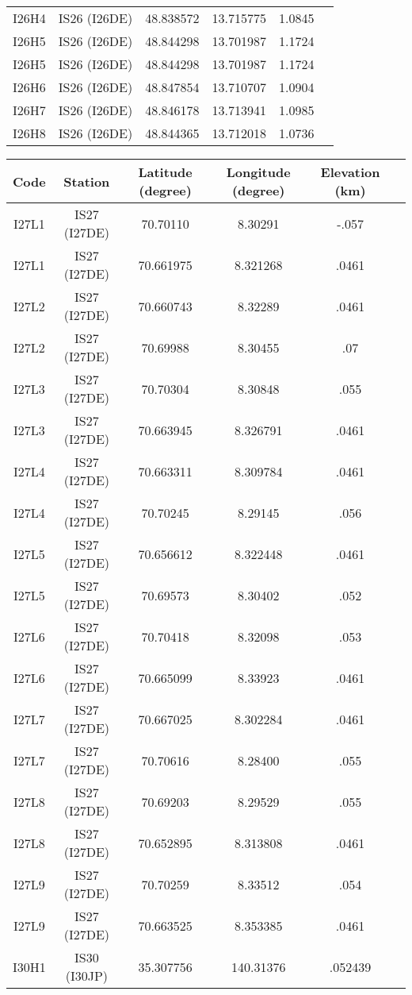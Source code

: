 \documentclass[a4paper, 10pt]{report}
\begin{document}
{\begin{center}
\begin{tabular}{|c|c|c|c|c|c|}
I26H4&	IS26 (I26DE)&	 	48.838572&	13.715775&	1.0845\\
I26H5&	IS26 (I26DE)&	 	48.844298&	13.701987&	1.1724\\
I26H5&	IS26 (I26DE)&	 	48.844298&	13.701987&	1.1724\\
I26H6&	IS26 (I26DE)&	 	48.847854&	13.710707&	1.0904\\
I26H7&	IS26 (I26DE)&	 	48.846178&	13.713941&	1.0985\\
I26H8&	IS26 (I26DE)&	 	48.844365&	13.712018&	1.0736\\
\hline
\end{tabular}
\end{center}
\begin{center}
\begin{tabular}{|c|c|c|c|c|c|}
\hline
Code&	Station&	Latitude (degree)&	Longitude (degree)&	Elevation (km)\\
\hline
I27L1&	IS27 (I27DE)&	 	70.70110&	8.30291&	-.057\\
I27L1&	IS27 (I27DE)&	 	70.661975&	8.321268&	.0461\\
I27L2&	IS27 (I27DE)&	 	70.660743&	8.32289&	.0461\\
I27L2&	IS27 (I27DE)&	 	70.69988&	8.30455&	.07\\
I27L3&	IS27 (I27DE)&	 	70.70304&	8.30848&	.055\\
I27L3&	IS27 (I27DE)&	 	70.663945&	8.326791&	.0461\\
I27L4&	IS27 (I27DE)&	 	70.663311&	8.309784&	.0461\\
I27L4&	IS27 (I27DE)&	 	70.70245&	8.29145&	.056\\
I27L5&	IS27 (I27DE)&	 	70.656612&	8.322448&	.0461\\
I27L5&	IS27 (I27DE)&	 	70.69573&	8.30402&	.052\\
I27L6&	IS27 (I27DE)&	 	70.70418&	8.32098&	.053\\
I27L6&	IS27 (I27DE)&	 	70.665099&	8.33923&	.0461\\
I27L7&	IS27 (I27DE)&	 	70.667025&	8.302284&	.0461\\
I27L7&	IS27 (I27DE)&	 	70.70616&	8.28400&	.055\\
I27L8&	IS27 (I27DE)&	 	70.69203&	8.29529&	.055\\
I27L8&	IS27 (I27DE)&	 	70.652895&	8.313808&	.0461\\
I27L9&	IS27 (I27DE)&	 	70.70259&	8.33512&	.054\\
I27L9&	IS27 (I27DE)&	 	70.663525&	8.353385&	.0461\\
I30H1&	IS30 (I30JP)&	 	35.307756&	140.31376&	.052439\\

\end{tabular}
\end{center}}
\end{document}
